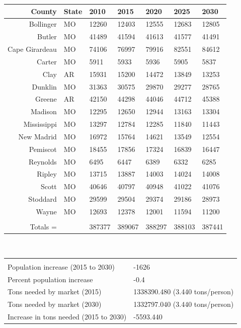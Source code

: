 \begin{tabular}{r|*{6}{l}}
County & State & 2010 & 2015 & 2020 & 2025 & 2030 \\ 
\hline
Bollinger & MO & 12260 & 12403 & 12555 & 12683 & 12805\\ 
Butler & MO & 41489 & 41594 & 41613 & 41577 & 41491\\ 
Cape Girardeau & MO & 74106 & 76997 & 79916 & 82551 & 84612\\ 
Carter & MO & 5911 & 5933 & 5936 & 5905 & 5837\\ 
Clay & AR & 15931 & 15200 & 14472 & 13849 & 13253\\ 
Dunklin & MO & 31363 & 30575 & 29870 & 29277 & 28765\\ 
Greene & AR & 42150 & 44298 & 44046 & 44712 & 45388\\ 
Madison & MO & 12295 & 12650 & 12944 & 13163 & 13304\\ 
Mississippi & MO & 13297 & 12784 & 12285 & 11840 & 11443\\ 
New Madrid & MO & 16972 & 15764 & 14621 & 13549 & 12554\\ 
Pemiscot & MO & 18455 & 17856 & 17324 & 16839 & 16447\\ 
Reynolds & MO & 6495 & 6447 & 6389 & 6332 & 6285\\ 
Ripley & MO & 13715 & 13887 & 14003 & 14024 & 14008\\ 
Scott & MO & 40646 & 40797 & 40948 & 41022 & 41076\\ 
Stoddard & MO & 29599 & 29504 & 29374 & 29186 & 28973\\ 
Wayne & MO & 12693 & 12378 & 12001 & 11594 & 11200\\ 
& & & & & &\\ 
\hline\hline
    Totals = &  & 387377 & 389067 & 388297 & 388103 & 387441\\
\end{tabular} \\ 
\begin{tabular}{l|l}
\hline\hline
& \\
 Population increase (2015 to 2030) & -1626 \\ 
 Percent population increase & -0.4 \\ 
 Tons needed by market (2015) & 1338390.480  (3.440 tons/person) \\ 
 Tons needed by market (2030) & 1332797.040  (3.440 tons/person) \\ 
 Increase in tons needed (2015 to 2030) & -5593.440 \\ 
\end{tabular}
